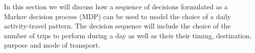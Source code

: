 \label{seq:mdp}
In this section we will discuss how a sequence of decisions formulated as a Markov decision process (MDP) can be used to model the choice of a daily activity-travel pattern. The decision sequence will include the choice of the number of trips to perform during a day as well as their their timing, destination, purpose and mode of transport.%

% 

